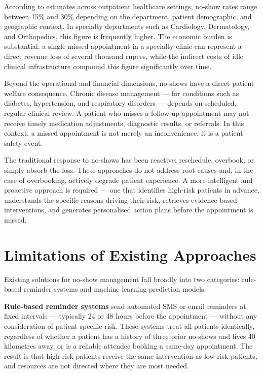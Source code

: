 \documentclass[12pt, a4paper]{report}
\begin{document}
According to estimates across outpatient healthcare settings, no-show rates range between 15\% and 30\% depending on the department, patient demographic, and geographic context. In specialty departments such as Cardiology, Dermatology, and Orthopedics, this figure is frequently higher. The economic burden is substantial: a single missed appointment in a specialty clinic can represent a direct revenue loss of several thousand rupees, while the indirect costs of idle clinical infrastructure compound this figure significantly over time.

Beyond the operational and financial dimensions, no-shows have a direct patient welfare consequence. Chronic disease management --- for conditions such as diabetes, hypertension, and respiratory disorders --- depends on scheduled, regular clinical review. A patient who misses a follow-up appointment may not receive timely medication adjustments, diagnostic results, or referrals. In this context, a missed appointment is not merely an inconvenience; it is a patient safety event.

The traditional response to no-shows has been reactive: reschedule, overbook, or simply absorb the loss. These approaches do not address root causes and, in the case of overbooking, actively degrade patient experience. A more intelligent and proactive approach is required --- one that identifies high-risk patients in advance, understands the specific reasons driving their risk, retrieves evidence-based interventions, and generates personalised action plans before the appointment is missed.

\vspace{1cm}
\section{Limitations of Existing Approaches}

Existing solutions for no-show management fall broadly into two categories: rule-based reminder systems and machine learning prediction models.

\textbf{Rule-based reminder systems} send automated SMS or email reminders at fixed intervals --- typically 24 or 48 hours before the appointment --- without any consideration of patient-specific risk. These systems treat all patients identically, regardless of whether a patient has a history of three prior no-shows and lives 40 kilometres away, or is a reliable attendee booking a same-day appointment. The result is that high-risk patients receive the same intervention as low-risk patients, and resources are not directed where they are most needed.
\end{document}

